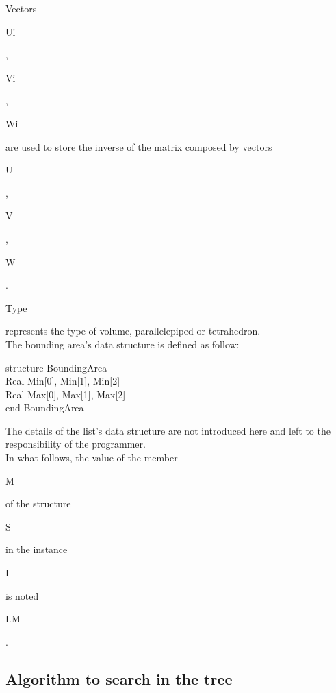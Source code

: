 \documentclass[12pt, a4paper]{article}
\begin{document}
\noindent Vectors \begin{ttfamily}Ui\end{ttfamily}, \begin{ttfamily}Vi\end{ttfamily}, \begin{ttfamily}Wi\end{ttfamily} are used to store the inverse of the matrix composed by vectors \begin{ttfamily}U\end{ttfamily}, \begin{ttfamily}V\end{ttfamily}, \begin{ttfamily}W\end{ttfamily}. \begin{ttfamily}Type\end{ttfamily} represents the type of volume, parallelepiped or tetrahedron.\\

\noindent The bounding area's data structure is defined as follow:\\

\begin{ttfamily}
\noindent structure BoundingArea\\
\hspace*{1em} Real Min[0], Min[1], Min[2]\\
\hspace*{1em} Real Max[0], Max[1], Max[2]\\
end BoundingArea\\
\end{ttfamily}

\noindent The details of the list's data structure are not introduced here and left to the responsibility of the programmer.\\

\noindent In what follows, the value of the member \begin{ttfamily}M\end{ttfamily} of the structure \begin{ttfamily}S\end{ttfamily} in the instance \begin{ttfamily}I\end{ttfamily} is noted \begin{ttfamily}I.M\end{ttfamily}.

\subsection{Algorithm to search in the tree}
\end{document}
